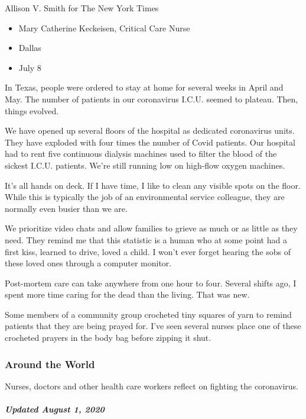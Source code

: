 Allison V. Smith for The New York Times

\begin{itemize}
\tightlist
\item
  Mary Catherine Keckeisen, Critical Care Nurse
\item
  Dallas
\item
  July 8
\end{itemize}

In Texas, people were ordered to stay at home for several weeks in April
and May. The number of patients in our coronavirus I.C.U. seemed to
plateau. Then, things evolved.

We have opened up several floors of the hospital as dedicated
coronavirus units. They have exploded with four times the number of
Covid patients. Our hospital had to rent five continuous dialysis
machines used to filter the blood of the sickest I.C.U. patients. We're
still running low on high-flow oxygen machines.

It's all hands on deck. If I have time, I like to clean any visible
spots on the floor. While this is typically the job of an environmental
service colleague, they are normally even busier than we are.

We prioritize video chats and allow families to grieve as much or as
little as they need. They remind me that this statistic is a human who
at some point had a first kiss, learned to drive, loved a child. I won't
ever forget hearing the sobs of these loved ones through a computer
monitor.

Post-mortem care can take anywhere from one hour to four. Several shifts
ago, I spent more time caring for the dead than the living. That was
new.

Some members of a community group crocheted tiny squares of yarn to
remind patients that they are being prayed for. I've seen several nurses
place one of these crocheted prayers in the body bag before zipping it
shut.

\hypertarget{around-the-world-1}{%
\subsubsection{Around the World}\label{around-the-world-1}}

Nurses, doctors and other health care workers reflect on fighting the
coronavirus.

\hypertarget{updated-august-1-2020-3}{%
\subparagraph{Updated August 1, 2020}\label{updated-august-1-2020-3}}

